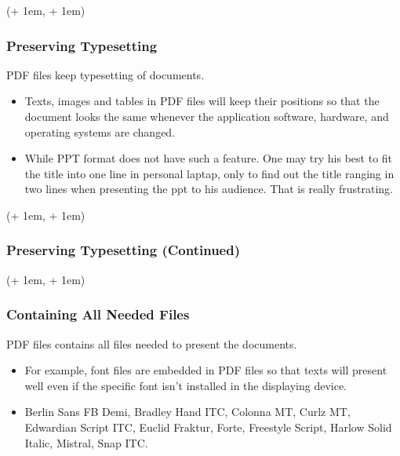 \documentclass[xcolor=dvipsnames]{beamer}
\newcommand{\FrameTextCrono}[1]{
    \begin{textblock*}{\paperwidth}(\textwidth + 1em, \textheight + 1em)
        #1
    \end{textblock*}
}
\let\oldframe\frame
\let\oldendframe\endframe
\renewenvironment{frame}
    {\oldframe\FrameTextCrono{\small\color{blue}{\crono}}}
    {\oldendframe}
\begin{document}
    \begin{frame}
        \frametitle{Preserving Typesetting}
        PDF files keep typesetting of documents.
        \begin{itemize}
            \item Texts, images and tables in PDF files will keep their positions
                so that the document looks the same
                whenever the application software, hardware,
                and operating systems are changed.
            \item While PPT format does not have such a feature.
                One may try his best to fit the title into one line
                in personal laptap, only to find out the title ranging in two
                lines when presenting the ppt to his audience. That is really
                frustrating.
        \end{itemize}
    \end{frame}

    \begin{frame}
        \frametitle{Preserving Typesetting (Continued)}
    \end{frame}

    \begin{frame}
        \frametitle{Containing All Needed Files}
        PDF files contains all files needed to present the documents.
        \begin{itemize}
            \item For example, font files are embedded in PDF files so that
            texts will present well even if the specific font isn't installed
            in the displaying device.
            \item {Berlin Sans FB Demi,}
            {Bradley Hand ITC,}
            {Colonna MT,}
            {Curlz MT,}
            {Edwardian Script ITC,}
            {Euclid Fraktur,}
            {Forte,}
            {Freestyle Script,}
            {Harlow Solid Italic,}
            {Mistral,}
            {Snap ITC.}
        \end{itemize}
    \end{frame}
\end{document}
